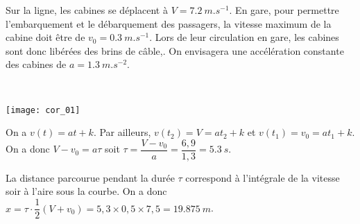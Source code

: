 Sur la ligne, les cabines se déplacent à $V = \SI{7,2}{m.s^{-1}}$. En gare, pour permettre l’embarquement et le
débarquement des passagers, la vitesse maximum de la cabine doit être de $v_0 = \SI{0.3}{m.s^{-1}}$.
Lors de leur circulation en gare, les cabines sont donc libérées des brins de câble,.%
On envisagera une accélération constante des cabines de $a=\SI{1.3}{m.s^{-2}}$.
\fi
{}
\ifprof\begin{corrige} ~\\

\begin{minipage}[c]{.4\linewidth}
\begin{center}
\texttt{[image: cor\_01]}
\end{center}
\end{minipage} \hfill
\begin{minipage}[c]{.5\linewidth}

On a $v(t)=at+k$. Par ailleurs, $v(t_2)=V=at_2+k$ et $v(t_1)=v_0=at_1+k$. On a donc $V-v_0 =  a\tau $ soit $\tau = \dfrac{V-v_0}{a} = \dfrac{6,9}{1,3} =\SI{5,3}{s}$.


La distance parcourue pendant la durée $\tau$ correspond à l'intégrale de la vitesse soir à l'aire sous la courbe.
On a donc $x=\tau \cdot\dfrac{1}{2}\left(V+v_0\right)=5,3\times 0,5\times 7,5 = \SI{19,875}{m}$.
\end{minipage}
\end{corrige}\else\fi

